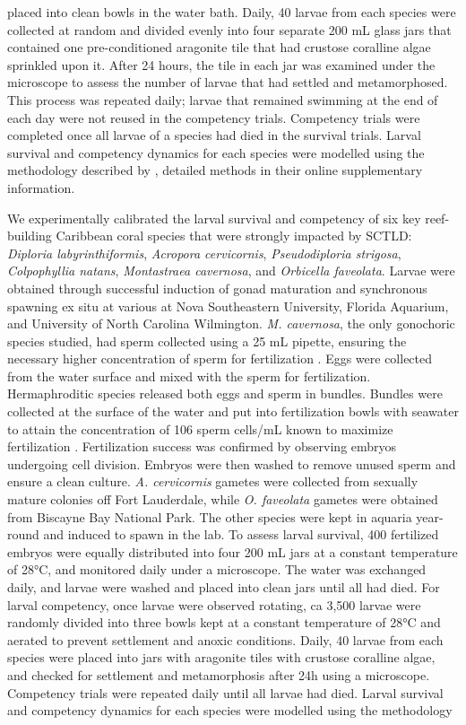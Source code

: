 \documentclass[preprint,12pt,authoryear]{elsarticle}
\begin{document}
placed into clean bowls in the water bath. Daily, 40 larvae from each species were collected at random and divided evenly into four separate 200 mL glass jars that contained one pre-conditioned aragonite tile that had crustose coralline algae sprinkled upon it. After 24 hours, the tile in each jar was examined under the microscope to assess the number of larvae that had settled and metamorphosed. This process was repeated daily; larvae that remained swimming at the end of each day were not reused in the competency trials. Competency trials were completed once all larvae of a species had died in the survival trials. Larval survival and competency dynamics for each species were modelled using the methodology described by \cite{figueiredo2022global}, detailed methods in their online supplementary information.
	
	We experimentally calibrated the larval survival and competency of six key reef-building Caribbean coral species that were strongly impacted by SCTLD: \textit{Diploria labyrinthiformis}, \textit{Acropora cervicornis}, \textit{Pseudodiploria strigosa}, \textit{Colpophyllia natans}, \textit{Montastraea cavernosa}, and \textit{Orbicella faveolata}. Larvae were obtained through successful induction of gonad maturation and synchronous spawning ex situ at various at Nova Southeastern University, Florida Aquarium, and University of North Carolina Wilmington. \textit{M. cavernosa}, the only gonochoric species studied, had sperm collected using a 25 mL pipette, ensuring the necessary higher concentration of sperm for fertilization \citep{fogarty2012asymmetric, fogarty2012weak, dela2020optimising}. Eggs were collected from the water surface and mixed with the sperm for fertilization. Hermaphroditic species released both eggs and sperm in bundles. Bundles were collected at the surface of the water and put into fertilization bowls with seawater to attain the concentration of 106 sperm cells/mL known to maximize fertilization \citep{fogarty2012asymmetric, fogarty2012weak, dela2020optimising}. Fertilization success was confirmed by observing embryos undergoing cell division. Embryos were then washed to remove unused sperm and ensure a clean culture. \textit{A. cervicornis} gametes were collected from sexually mature colonies off Fort Lauderdale, while \textit{O. faveolata} gametes were obtained from Biscayne Bay National Park. The other species were kept in aquaria year-round and induced to spawn in the lab. To assess larval survival, 400 fertilized embryos were equally distributed into four 200 mL jars at a constant temperature of 28°C, and monitored daily under a microscope. The water was exchanged daily, and larvae were washed and placed into clean jars until all had died. For larval competency, once larvae were observed rotating, ca 3,500 larvae were randomly divided into three bowls kept at a constant temperature of 28°C and aerated to prevent settlement and anoxic conditions. Daily, 40 larvae from each species were placed into jars with aragonite tiles with crustose coralline algae, and checked for settlement and metamorphosis after 24h using a microscope. Competency trials were repeated daily until all larvae had died. Larval survival and competency dynamics for each species were modelled using the methodology 
\end{document}
